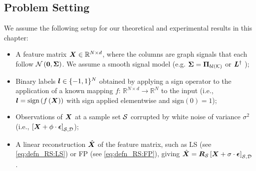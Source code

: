 \subsection{Problem Setting}
\label{sec:problem_setting}
We assume the following setup for our theoretical and experimental results in this chapter: %
\begin{itemize}
    \item A feature matrix $\bm{X}\in\mathbb{R}^{N \times d}$, where the columns are  graph signals that each follow $\mathcal{N}\left(\bm{0},\bm{\Sigma}\right)$. We assume a smooth signal model (e.g. $\matr{\Sigma} = \projbl$ \cite{sripathmanathan2024impact} or $\bm{L}^{\dagger}$ \cite{dong2016learning});
    \item Binary labels $\bm{l} \in \{-1,1\}^{N}$ obtained by applying a sign operator to the application of a known mapping $f:\, \mathbb{R}^{N \times d}\to \mathbb{R}^{N}$ to the input (i.e., $\bm{l} = \text{sign}\left(f\left(\bm{X}\right)\right)$ with sign applied elementwise and $\text{sign}(0) = 1$);
    \item Observations of $\bm{X}$ at a sample set $\mathcal{S}$ corrupted by white noise of variance $\sigma^{2}$ (i.e., $\msubgen[\set{S},\set{D}]{\matr{X} + \phi \cdot \matr{\epsilon}}$); %
    \item A linear reconstruction $\hat{\bm{X}}$ of the feature matrix, such as LS (see \eqref{eq:defn_RS:LS}) or FP (see \eqref{eq:defn_RS:FP}), giving $\hat{\matr{X}} = \matr{R}_{\set{S}} \msubgen[\set{S},\set{D}]{\matr{X} + \sigma \cdot \matr{\epsilon}}$.
\end{itemize}

